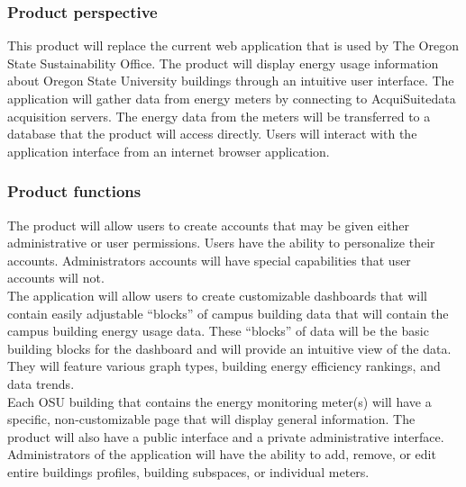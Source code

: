     \subsubsection{Product perspective}

    This product will replace the current web application that is used by The Oregon State Sustainability Office. The product will display energy usage information about Oregon State University buildings through an intuitive user interface. The application will gather data from energy meters by connecting to AcquiSuite\texttrademark data acquisition servers. The energy data from the meters will be transferred to a database that the product will access directly. Users will interact with the application interface from an internet browser application. 
    
    \subsubsection{Product functions}
    The product will allow users to create accounts that may be given either administrative or user permissions. Users have the ability to personalize their accounts. Administrators accounts will have special capabilities that user accounts will not. \\
    The application will allow users to create customizable dashboards that will contain easily adjustable “blocks” of campus building data that will contain the campus building energy usage data. These “blocks” of data will be the basic building blocks for the dashboard and will provide an intuitive view of the data. They will feature various graph types, building energy efficiency rankings, and data trends.\\
    Each OSU building that contains the energy monitoring meter(s) will have a specific, non-customizable page that will display general information. The product will also have a public interface and a private administrative interface.\\
    Administrators of the application will have the ability to add, remove, or edit entire buildings profiles, building subspaces, or individual meters.
    
